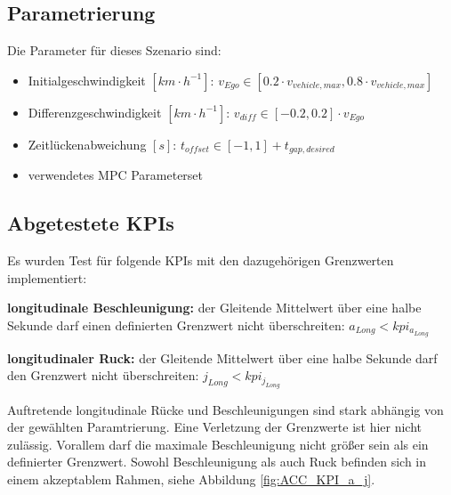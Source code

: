 \subsection{Parametrierung}
Die Parameter für dieses Szenario sind:
\begin{itemize}
    \item Initialgeschwindigkeit $[km\cdot h^{-1}]$: $v_{Ego} \in [0.2\cdot v_{vehicle,max}, 0.8\cdot v_{vehicle,max}]$
    \item Differenzgeschwindigkeit $[km\cdot h^{-1}]$: $v_{diff} \in [-0.2,0.2]\cdot v_{Ego}$
    \item Zeitlückenabweichung $[s]$: $t_{offset} \in [-1,1] + t_{gap,desired}$
    \item verwendetes MPC Parameterset
\end{itemize}

\subsection{Abgetestete KPIs}
Es wurden Test für folgende KPIs mit den dazugehörigen Grenzwerten implementiert:

\medskip\noindent\textbf{longitudinale Beschleunigung:} der Gleitende Mittelwert über eine halbe Sekunde darf einen definierten Grenzwert nicht überschreiten: $a_{Long} < kpi_{a_{Long}}$

\medskip\noindent\textbf{longitudinaler Ruck:} der Gleitende Mittelwert über eine halbe Sekunde darf den Grenzwert nicht überschreiten: $j_{Long} < kpi_{j_{Long}}$

\noindent Auftretende longitudinale Rücke und Beschleunigungen sind stark abhängig von der gewählten Paramtrierung. Eine Verletzung der Grenzwerte ist hier nicht zulässig. Vorallem darf die maximale Beschleunigung nicht größer sein als ein definierter Grenzwert. Sowohl Beschleunigung als auch Ruck befinden sich in einem akzeptablem Rahmen, siehe Abbildung \ref{fig:ACC_KPI_a_j}.

